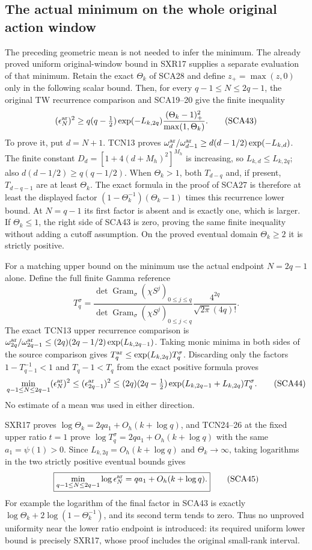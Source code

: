 \subsection{The actual minimum on the whole original action window}

The preceding geometric mean is not needed to infer the minimum. The
already proved uniform original-window bound in SXR17 supplies a separate
evaluation of that minimum. Retain the exact $\Theta_k$ of SCA28 and
define $z_+=\max(z,0)$ only in the following scalar bound. Then, for
every $q-1\le N\le2q-1$, the original TW recurrence comparison and
SCA19--20 give the finite inequality
\[
 (\epsilon_N^{\rm ar})^2\ge
 q(q-\tfrac12)\exp(-L_{k,2q})
       \frac{(\Theta_k-1)_+^2}{\max(1,\Theta_k)}.
 \tag{SCA43}
\]
To prove it, put $d=N+1$. TCN13 proves
$\omega_d^{\rm ar}/\omega_{d-1}^{\rm ar}
 \ge d(d-1/2)\exp(-L_{k,d})$.
The finite constant $D_d=[1+4(d+M_h)^2]^{M_h}$ is increasing, so
$L_{k,d}\le L_{k,2q}$; also $d(d-1/2)\ge q(q-1/2)$.
When $\Theta_k>1$, both $T_{d-q}$ and, if present, $T_{d-q-1}$
are at least $\Theta_k$. The exact formula in the proof of SCA27
is therefore at least the displayed factor
$(1-\Theta_k^{-1})(\Theta_k-1)$ times this recurrence lower bound.
At $N=q-1$ its first factor is absent and is exactly one, which is
larger. If $\Theta_k\le1$, the right side of SCA43 is zero, proving
the same finite inequality without adding a cutoff assumption.
On the proved eventual domain $\Theta_k\ge2$ it is strictly positive.

For a matching upper bound on the minimum use the actual endpoint
$N=2q-1$ alone. Define the full finite Gamma reference
\[
 T_q^\sigma=
 \frac{\det\operatorname{Gram}_\sigma(\chi S^j)_{0\le j\le q}}
      {\det\operatorname{Gram}_\sigma(\chi S^j)_{0\le j<q}}
 \frac{4^{2q}}{\sqrt{2\pi}(4q)!}.
\]
The exact TCN13 upper recurrence comparison is
$\omega_{2q}^{\rm ar}/\omega_{2q-1}^{\rm ar}
 \le (2q)(2q-1/2)\exp(L_{k,2q-1})$.
Taking monic minima in both sides of the source comparison gives
$T_q^{\rm ar}\le\exp(L_{k,2q})T_q^\sigma$.
Discarding only the factors $1-T_{q-1}^{-1}<1$ and
$T_q-1<T_q$ from the exact positive formula proves
\[
 \min_{q-1\le N\le2q-1}(\epsilon_N^{\rm ar})^2
 \le (\epsilon_{2q-1}^{\rm ar})^2
 \le (2q)(2q-\tfrac12)
          \exp(L_{k,2q-1}+L_{k,2q})T_q^\sigma.
 \tag{SCA44}
\]
No estimate of a mean was used in either direction.

SXR17 proves $\log\Theta_k=2qa_1+O_h(k+\log q)$, and TCN24--26
at the fixed upper ratio $t=1$ prove
$\log T_q^\sigma=2qa_1+O_h(k+\log q)$ with the same $a_1=\psi(1)>0$.
Since $L_{k,2q}=O_h(k+\log q)$ and $\Theta_k\to\infty$, taking
logarithms in the two strictly positive eventual bounds gives
\[
 \boxed{\min_{q-1\le N\le2q-1}\log\epsilon_N^{\rm ar}
                =qa_1+O_h(k+\log q).}
 \tag{SCA45}
\]
For example the logarithm of the final factor in SCA43 is exactly
$\log\Theta_k+2\log(1-\Theta_k^{-1})$, and its second term tends
to zero. Thus no unproved uniformity near the lower ratio endpoint is
introduced: its required uniform lower bound is precisely SXR17,
whose proof includes the original small-rank interval.

